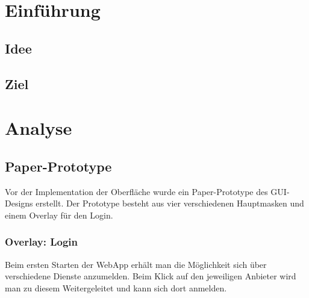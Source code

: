 \section{Einführung}
\subsection{Idee}


\subsection{Ziel}


\section{Analyse}

\setcounter{subfigure}{0}

\subsection{Paper-Prototype}
Vor der Implementation der Oberfläche wurde ein Paper-Prototype des GUI-Designs erstellt.
Der Prototype besteht aus vier verschiedenen Hauptmasken und einem Overlay für den Login.

\subsubsection{Overlay: Login}
Beim ersten Starten der \gls{WebApp} erhält man die Möglichkeit sich über verschiedene Dienste anzumelden.
Beim Klick auf den jeweiligen Anbieter wird man zu diesem Weitergeleitet und kann sich dort anmelden.

